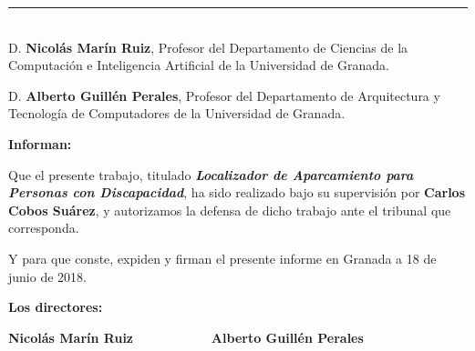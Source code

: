 \noindent\rule[-1ex]{\textwidth}{2pt}\\[4.5ex]

D. \textbf{Nicolás Marín Ruiz}, Profesor del Departamento de Ciencias de la Computación e Inteligencia Artificial de la Universidad de Granada.

\vspace{0.5cm}

D. \textbf{Alberto Guillén Perales}, Profesor del Departamento de Arquitectura y Tecnología de Computadores de la Universidad de Granada.


\vspace{0.5cm}

\textbf{Informan:}

\vspace{0.5cm}

Que el presente trabajo, titulado \textit{\textbf{Localizador de Aparcamiento para Personas con Discapacidad}},
ha sido realizado bajo su supervisión por \textbf{Carlos Cobos Suárez}, y autorizamos la defensa de dicho trabajo ante el tribunal
que corresponda.

\vspace{0.5cm}

Y para que conste, expiden y firman el presente informe en Granada a 18 de junio de 2018.

\vspace{1cm}

\textbf{Los directores:}

\vspace{5cm}

\noindent \textbf{Nicolás Marín Ruiz \ \ \ \ \ \ \ \ \ \ Alberto Guillén Perales}
